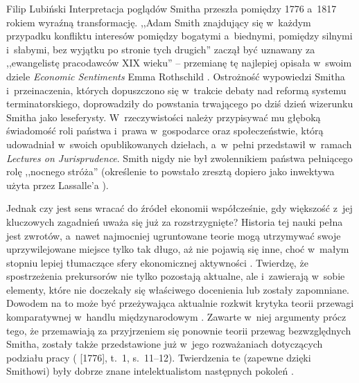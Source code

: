 \begin{artplenv}{Filip Lubiński}
Interpretacja poglądów Smitha przeszła pomiędzy 1776 a~1817 rokiem wyraźną transformację. ,,Adam Smith znajdujący
się w~każdym przypadku konfliktu interesów pomiędzy bogatymi a~biednymi, pomiędzy silnymi i~słabymi, bez wyjątku po
stronie tych drugich''
\parencite[s.~223]{menger_kleinere_1935}
zaczął być uznawany za ,,ewangelistę pracodawców
XIX wieku'' -- przemianę tę najlepiej opisała w~swoim dziele \textit{Economic Sentiments} Emma Rothschild
\parencite*[s.~113]{rothschild_economic_2002}.
Ostrożność wypowiedzi Smitha i~przeinaczenia, których dopuszczono
się w~trakcie debaty nad reformą systemu terminatorskiego, doprowadziły do powstania trwającego po dziś dzień wizerunku
Smitha jako leseferysty. W~rzeczywistości należy przypisywać mu głęboką świadomość roli państwa i~prawa w~gospodarce
oraz społeczeństwie, którą udowadniał w~swoich opublikowanych dziełach, a~w~pełni przedstawił w~ramach \textit{Lectures
on Jurisprudence}. Smith nigdy nie był zwolennikiem państwa pełniącego rolę ,,nocnego stróża'' (określenie to powstało
zresztą dopiero jako inwektywa użyta przez Lassalle'a
\parencite[s.~87]{sawer_ethical_2003}).

Jednak czy jest sens wracać do źródeł ekonomii współcześnie, gdy większość z~jej kluczowych zagadnień uważa się już
za rozstrzygnięte? Historia tej nauki pełna jest zwrotów, a~nawet najmocniej ugruntowane teorie mogą utrzymywać swoje
uprzywilejowane miejsce tylko tak długo, aż nie pojawią się inne, choć w~małym stopniu lepiej tłumaczące sfery
ekonomicznej aktywności
\parencite[s.~33]{blaug_teoria_1994}.
Twierdzę, że spostrzeżenia prekursorów nie tylko
pozostają aktualne, ale i~zawierają w~sobie elementy, które nie doczekały się właściwego docenienia lub zostały
zapomniane. Dowodem na to może być przeżywająca aktualnie rozkwit krytyka teorii przewagi komparatywnej w~handlu
międzynarodowym
\parencite{reinert_how_2008}.
Zawarte w~niej argumenty prócz tego, że przemawiają za
przyjrzeniem się ponownie teorii przewag bezwzględnych Smitha, zostały także przedstawione już w~jego rozważaniach
dotyczących podziału pracy
(\cite{smith_badania_2007} [1776], t.~1, s.~11--12).
Twierdzenia te (zapewne
dzięki Smithowi) były dobrze znane intelektualistom następnych pokoleń
\parencite[s.~343]{tolstoj_anna_1986}.


\end{artplenv}

